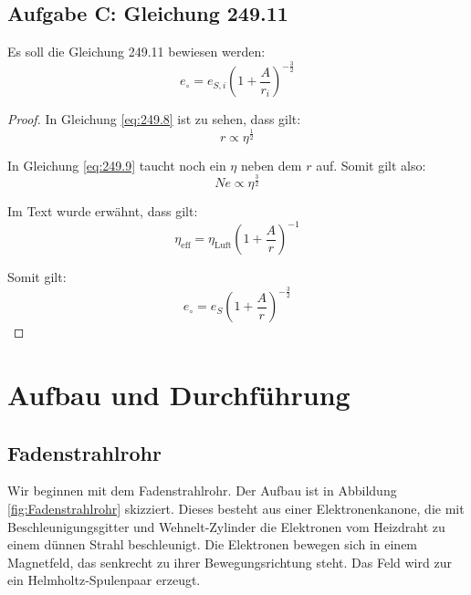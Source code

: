 \documentclass[11pt]{article}
\begin{document}
\subsection{Aufgabe C: Gleichung 249.11}

Es soll die Gleichung 249.11 bewiesen werden:
\[ e_\circ = e_{S, i} \left( 1 + \frac A{r_i} \right)^{-\frac 32} \]

\begin{proof}
	In Gleichung \eqref{eq:249.8} ist zu sehen, dass gilt:
	\[ r \propto \eta^{\frac 12} \]

	In Gleichung \eqref{eq:249.9} taucht noch ein $\eta$ neben dem $r$ auf.
	Somit gilt also:
	\[ N e \propto \eta^{\frac 32} \]

	Im Text wurde erwähnt, dass gilt:
	\[ \eta_\text{eff} = \eta_\text{Luft} \left( 1 + \frac Ar \right)^{-1} \]

	Somit gilt:
	\[ e_\circ = e_S \left( 1 + \frac Ar \right)^{-\frac 32} \]
\end{proof}


\section{Aufbau und Durchführung}

\subsection{Fadenstrahlrohr}

Wir beginnen mit dem Fadenstrahlrohr. Der Aufbau ist in Abbildung
\ref{fig:Fadenstrahlrohr} skizziert. Dieses besteht aus einer Elektronenkanone,
die mit Beschleunigungsgitter und Wehnelt-Zylinder die Elektronen vom Heizdraht
zu einem dünnen Strahl beschleunigt. Die Elektronen bewegen sich in einem
Magnetfeld, das senkrecht zu ihrer Bewegungsrichtung steht. Das Feld wird zur
ein Helmholtz-Spulenpaar erzeugt.
\end{document}
